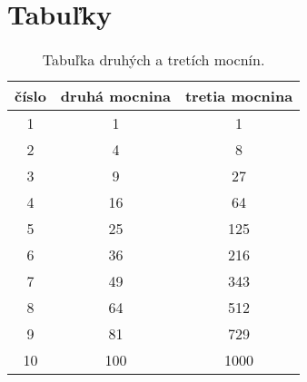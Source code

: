 \section{Tabuľky}

\begin{table}[h]
	\centering
	\begin{tabular}{| c | c | c |}
		\hline
		číslo & druhá mocnina & tretia mocnina\\
		\hline
		1 & 1 & 1\\
		2 & 4 & 8\\
		3 & 9 & 27\\
		4 & 16 & 64\\
		5 & 25 & 125\\
		6 & 36 & 216\\
		7 & 49 & 343\\
		8 & 64 & 512\\
		9 & 81 & 729\\
		10 & 100 & 1000\\
		\hline
	\end{tabular}
	\caption{Tabuľka druhých a tretích mocnín.}
	\label{table:druhe-a-tretie-mocniny}
\end{table}
